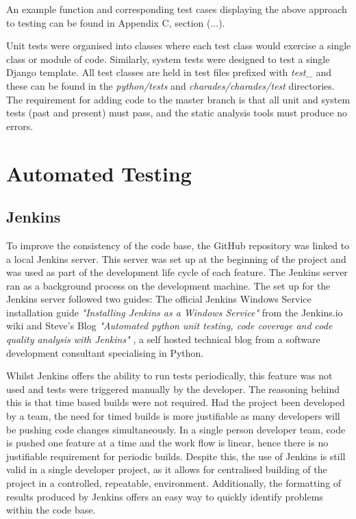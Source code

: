 An example function and corresponding test cases displaying the above approach to testing can be found in Appendix C, section (...).

Unit tests were organised into classes where each test class would exercise a single class or module of code. Similarly, system tests were designed to test a single Django template. All test classes are held in test files prefixed with \textit{test\_} and these can be found in the \textit{python/tests} and \textit{charades/charades/test} directories. The requirement for adding code to the master branch is that all unit and system tests (past and present) must pass, and the static analysis tools must produce no errors.


\section{Automated Testing}
\subsection{Jenkins}
To improve the consistency of the code base, the GitHub repository was linked to a local Jenkins server. This server was set up at the beginning of the project and was used as part of the development life cycle of each feature. The Jenkins server ran as a background process on the development machine. The set up for the Jenkins server followed two guides: The official Jenkins Windows Service installation guide \textit{"Installing Jenkins as a Windows Service"} \cite{jenkins_wiki_install} from the Jenkins.io wiki and Steve's Blog \textit{"Automated python unit testing, code coverage and code quality analysis with Jenkins"} \cite{steves_blog}, a self hosted technical blog from a software development consultant specialising in Python.

Whilst Jenkins offers the ability to run tests periodically, this feature was not used and tests were triggered manually by the developer. The reasoning behind this is that time based builds were not required. Had the project been developed by a team, the need for timed builds is more justifiable as many developers will be pushing code changes simultaneously. In a single person developer team, code is pushed one feature at a time and the work flow is linear, hence there is no justifiable requirement for periodic builds. Despite this, the use of Jenkins is still valid in a single developer project, as it allows for centralised building of the project in a controlled, repeatable, environment. Additionally, the formatting of results produced by Jenkins offers an easy way to quickly identify problems within the code base.

